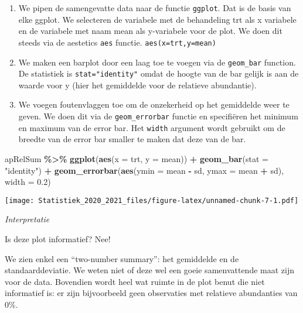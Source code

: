 \documentclass[
  12pt,dutch,coursenotes]{book}
\newenvironment{Shaded}{\begin{snugshade}}{\end{snugshade}}
\newcommand{\DataTypeTok}[1]{\textcolor[rgb]{0.13,0.29,0.53}{#1}}
\newcommand{\FloatTok}[1]{\textcolor[rgb]{0.00,0.00,0.81}{#1}}
\newcommand{\KeywordTok}[1]{\textcolor[rgb]{0.13,0.29,0.53}{\textbf{#1}}}
\newcommand{\NormalTok}[1]{#1}
\newcommand{\OperatorTok}[1]{\textcolor[rgb]{0.81,0.36,0.00}{\textbf{#1}}}
\newcommand{\StringTok}[1]{\textcolor[rgb]{0.31,0.60,0.02}{#1}}
\theoremstyle{definition}
\theoremstyle{definition}
\theoremstyle{definition}
\theoremstyle{remark}
\begin{document}
\begin{enumerate}
\def\labelenumi{\arabic{enumi}.}
\item
  We pipen de samengevatte data naar de functie \texttt{ggplot}. Dat is de basis van elke ggplot. We selecteren de variabele met de behandeling trt als x variabele en de variabele met naam mean als y-variabele voor de plot.
  We doen dit steeds via de aestetics \texttt{aes} functie. \texttt{aes(x=trt,y=mean)}
\item
  We maken een barplot door een laag toe te voegen via de \texttt{geom\_bar} function. De statistiek is \texttt{stat="identity"} omdat de hoogte van de bar gelijk is aan de waarde voor y (hier het gemiddelde voor de relatieve abundantie).
\item
  We voegen foutenvlaggen toe om de onzekerheid op het gemiddelde weer te geven. We doen dit via de \texttt{geom\_errorbar} functie en specifiëren het minimum en maximum van de error bar. Het \texttt{width} argument wordt gebruikt om de breedte van de error bar smaller te maken dat deze van de bar.
\end{enumerate}

\begin{Shaded}
\begin{Highlighting}[]
\NormalTok{apRelSum }\OperatorTok{\%\textgreater{}\%}\StringTok{ }\KeywordTok{ggplot}\NormalTok{(}\KeywordTok{aes}\NormalTok{(}\DataTypeTok{x =}\NormalTok{ trt, }\DataTypeTok{y =}\NormalTok{ mean)) }\OperatorTok{+}\StringTok{ }\KeywordTok{geom\_bar}\NormalTok{(}\DataTypeTok{stat =} \StringTok{"identity"}\NormalTok{) }\OperatorTok{+}\StringTok{ }
\StringTok{    }\KeywordTok{geom\_errorbar}\NormalTok{(}\KeywordTok{aes}\NormalTok{(}\DataTypeTok{ymin =}\NormalTok{ mean }\OperatorTok{{-}}\StringTok{ }\NormalTok{sd, }\DataTypeTok{ymax =}\NormalTok{ mean }\OperatorTok{+}\StringTok{ }
\StringTok{        }\NormalTok{sd), }\DataTypeTok{width =} \FloatTok{0.2}\NormalTok{)}
\end{Highlighting}
\end{Shaded}

\texttt{[image: Statistiek\_2020\_2021\_files/figure-latex/unnamed-chunk-7-1.pdf]}

\emph{Interpretatie}

Is deze plot informatief? Nee!

We zien enkel een ``two-number summary'': het gemiddelde en de standaarddeviatie. We weten niet of deze wel een goeie samenvattende maat zijn voor de data. Bovendien wordt heel wat ruimte in de plot benut die niet informatief is: er zijn bijvoorbeeld geen observaties met relatieve abundanties van 0\%.
\end{document}
